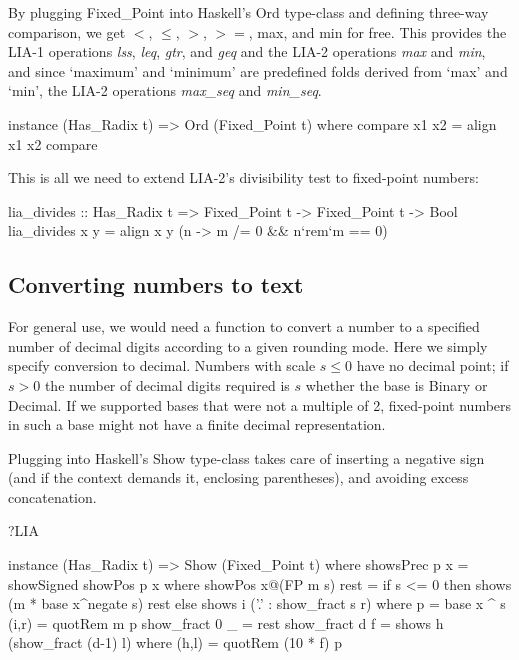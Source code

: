 \documentclass{article}
\begin{document}
By plugging Fixed\_Point into Haskell's Ord type-class and
defining three-way comparison, we get $<$, $\le$, $>$, $>=$,
max, and min for free.  This provides the LIA-1 operations {\it lss},
{\it leq}, {\it gtr}, and {\it geq} and the LIA-2 operations
{\it max} and {\it min}, and since `maximum' and `minimum' are
predefined folds derived from `max' and `min', the LIA-2
operations {\it max\_seq} and {\it min\_seq}.

\begin{code}
instance (Has_Radix t) => Ord (Fixed_Point t)
  where compare x1 x2 = align x1 x2 compare
\end{code}

This is all we need to extend LIA-2's divisibility test to
fixed-point numbers:
\begin{code}
lia_divides :: Has_Radix t => Fixed_Point t -> Fixed_Point t -> Bool
lia_divides x y = align x y (\m n -> m /= 0 && n`rem`m == 0)
\end{code}



\subsection{Converting numbers to text}

For general use, we would need a function to convert a
number to a specified number of decimal digits according
to a given rounding mode.  Here we simply specify conversion
to decimal.  Numbers with scale $s \le 0$ have no decimal
point; if $s > 0$ the number of decimal digits required is
$s$ whether the base is Binary or Decimal.  If we supported
bases that were not a multiple of 2, fixed-point numbers in
such a base might not have a finite decimal representation.

Plugging into Haskell's Show type-class takes care of
inserting a negative sign (and if the context demands it,
enclosing parentheses), and avoiding excess concatenation.

?LIA

\begin{code}
instance (Has_Radix t) => Show (Fixed_Point t)
  where
    showsPrec p x = showSigned showPos p x
      where showPos x@(FP m s) rest =
              if s <= 0 then shows (m * base x^negate s) rest
              else shows i ('.' : show_fract s r)
              where p = base x ^ s
                    (i,r) = quotRem m p
                    show_fract 0 _ = rest
                    show_fract d f = shows h (show_fract (d-1) l)
                      where (h,l) = quotRem (10 * f) p
\end{code}
\end{document}
